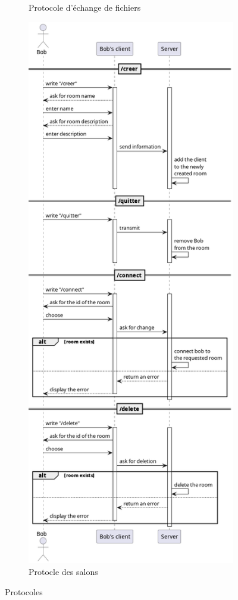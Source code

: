 \documentclass[a4paper,12pt]{article}
\begin{document}
\begin{figure}[h!]
\begin{subfigure}{0.45\linewidth}
		\caption{Protocole d'échange de fichiers}
	\end{subfigure}
	\hfill
	\begin{subfigure}{0.45\linewidth}
		\includegraphics[width=0.9\linewidth]{rooms.png}
		\caption{Protocle des salons}
	\end{subfigure}
	\caption{Protocoles}
	\hrulefill
\end{figure}
\end{document}
